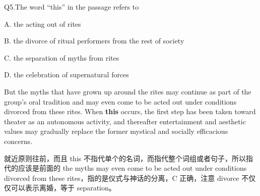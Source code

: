 \begin{blk}
  \begin{qst}
    Q5.The word “this” in the passage refers to
  \end{qst}

  \begin{chc}
    A. the acting out of rites

    B. the divorce of ritual performers from the rest of society

    C. the separation of myths from rites

    D. the celebration of supernatural forces
  \end{chc}

  \begin{psgq}
    But the myths that have grown up around the rites may continue as part of the group’s oral tradition and may even come to be acted out under conditions divorced from these rites. When \textbf{this} occurs, the first step has been taken toward theater as an autonomous activity, and thereafter entertainment and aesthetic values may gradually replace the former mystical and socially efficacious concerns.
  \end{psgq}

  \begin{nlz}
    就近原则往前，而且 this 不指代单个的名词，而指代整个词组或者句子，所以指代的应该是前面的 the myths may even come to be acted out under conditions divorced from these rites，指的是仪式与神话的分离，C 正确，注意 divorce 不仅仅可以表示离婚，等于 separation。
  \end{nlz}
\end{blk}

